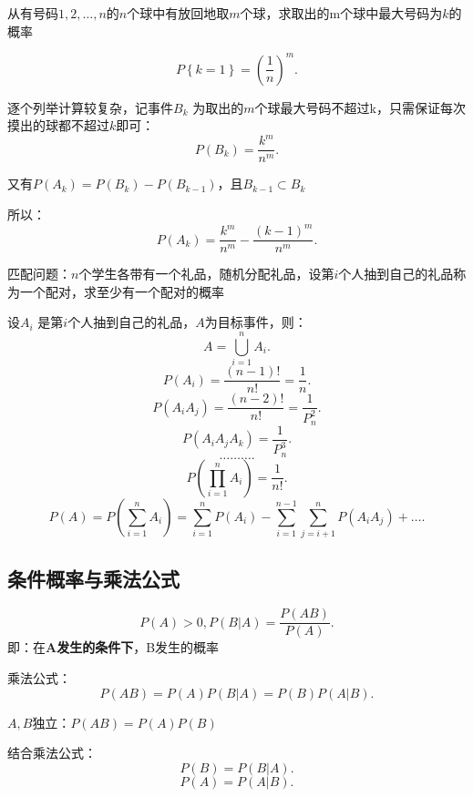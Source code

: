 \begin{eg}
    从有号码$1,2,\ldots,n$的$n$个球中有放回地取$m$个球，求取出的m个球中最大号码为$k$的概率

    \[
        P\left\{ k=1 \right\} =\left( \frac{1}{n} \right) ^m
    .\]  

    逐个列举计算较复杂，记事件$B_k$ 为取出的$m$个球最大号码不超过k，只需保证每次摸出的球都不超过$k$即可：
    \[
        P\left( B_{k} \right) =\frac{k^m}{n^m}
    .\] 

    又有$P\left( A_{k} \right) =P\left( B_{k} \right) -P\left( B_{k-1} \right) $，且$B_{k-1}\subset B_{k}$ 

    所以：\[
        P\left( A_k \right) =\frac{k^m}{n^m}-\frac{\left( k-1 \right) ^m}{n^m}
    .\] 
\end{eg}
 
\begin{eg}
    匹配问题：$n$个学生各带有一个礼品，随机分配礼品，设第$i$个人抽到自己的礼品称为一个配对，求至少有一个配对的概率

    设$A_{i}$ 是第$i$个人抽到自己的礼品，$A$为目标事件，则： \[
        A=\bigcup_{i=1}^{n}A_{i}
    .\] 
    \[
        P\left( A_{i} \right) =\frac{\left( n-1 \right) !}{n!}=\frac{1}{n}
    .\] 
    \[
        P\left( A_iA_j \right) =\frac{\left( n-2 \right) !}{n!}=\frac{1}{P_{n}^{2}}
    .\] 
    \[
        P\left( A_iA_jA_k \right) =\frac{1}{P_{n}^{3}}
    .\] 
    \[
        \ldots\ldots\ldots
    .\] 
    \[
        P\left( \prod_{i=1}^{n} A_i  \right) =\frac{1}{n!}
    .\] 
    \[
        P\left( A \right) =P\left( \sum_{i=1}^{n} A_{i} \right) = \sum_{i=1}^{n} P\left( A_{i} \right) -\sum_{i=1}^{n-1} \sum_{j=i+1}^{n} P\left( A_iA_j \right) +\ldots
    .\] 
\end{eg}


\subsection{条件概率与乘法公式}%
\label{sub:条件概率与乘法公式}
\begin{defi}
    \[
        P\left( A \right) >0,P\left( B | A \right) =\frac{P\left( AB \right) }{P\left( A \right) }
    .\] 
    即：在\textbf{A发生的条件下}，B发生的概率
\end{defi}
\begin{defi}
    乘法公式：\[
        P\left( AB \right) =P\left( A \right) P\left( B|A \right) =P\left( B \right) P\left( A|B \right) 
    .\] 
\end{defi}
\begin{notation}
    $A,B$独立：$P\left( AB \right) =P\left( A \right) P\left( B \right) $

    结合乘法公式：\[
        P\left( B \right) =P\left( B|A \right) 
    .\] 
    \[
        P\left( A \right) =P\left( A|B \right) 
    .\] 
\end{notation}
